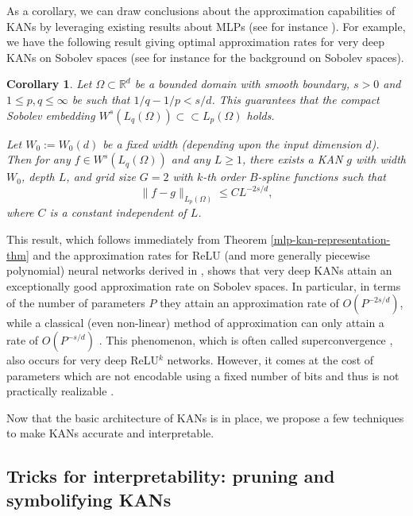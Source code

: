 \documentclass[12pt]{caltech_thesis}
\newtheorem{corollary}[theorem]{Corollary}
\numberwithin{equation}{section}
\begin{document}
As a corollary, we can draw conclusions about the approximation capabilities of KANs by leveraging existing results about MLPs (see for instance \cite{barron1993universal,leshno1993multilayer,klusowski2018approximation,siegel2020approximation,siegel2022sharp,hon2022simultaneous,lu2021deep,shen2022optimal,yarotsky2018optimal,siegel2023optimal,yang2023nearly,yang2023optimal}). For example, we have the following result giving optimal approximation rates for very deep KANs on Sobolev spaces (see for instance \cite{adams2003sobolev} for the background on Sobolev spaces).
\begin{corollary}
\label{corollary}
    Let $\Omega\subset \mathbb{R}^d$ be a bounded domain with smooth boundary, $s > 0$ and $1\leq p,q\leq \infty$ be such that $1/q - 1/p < s/d$. This guarantees that the compact Sobolev embedding $W^s(L_q(\Omega))\subset\subset L_p(\Omega)$ holds. 
    
    Let $W_0 := W_0(d)$ be a fixed width (depending upon the input dimension $d$). Then for any $f\in W^s(L_q(\Omega))$ and any $L \geq 1$, there exists a KAN $g$ with width $W_0$, depth $L$, and grid size {$G=2$} with $k$-th order $B$-spline functions such that
    \begin{equation}
        \|f - g\|_{L_p(\Omega)} \leq CL^{-2s/d},
    \end{equation}
    where $C$ is a constant independent of $L$.
\end{corollary}
This result, which follows immediately from Theorem \ref{mlp-kan-representation-thm} and the approximation rates for ReLU (and more generally piecewise polynomial) neural networks derived in \cite{siegel2023optimal}, shows that very deep KANs attain an exceptionally good approximation rate on Sobolev spaces. In particular, in terms of the number of parameters $P$ they attain an approximation rate of $O(P^{-2s/d})$, while a classical (even non-linear) method of approximation can only attain a rate of $O(P^{-s/d})$ \cite{devore1998nonlinear}. This phenomenon, which is often called superconvergence \cite{devore2021neural}, also occurs for very deep ReLU$^k$ networks. However, it comes at the cost of parameters which are not encodable using a fixed number of bits and thus is not practically realizable \cite{yarotsky2020phase,siegel2023optimal}.

Now that the basic architecture of KANs is in place, we propose a few techniques to make KANs accurate and interpretable.

\subsection{Tricks for interpretability: pruning and symbolifying KANs}\label{subsec:kan_simplification}
\end{document}
